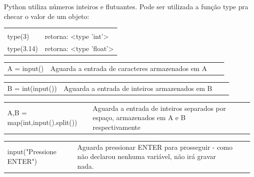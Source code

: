 \documentclass[landscape,a0paper,fontscale=0.285]{baposter} %
\begin{document}
\begin{poster}
{						
						\colorbox[HTML]{CCFFFF}{} \linebreak \linebreak
						Python utiliza números inteiros e flutuantes. Pode ser utilizada a função type pra checar o valor de um objeto:\\
						\begin{tabular}{l l}
							\textbf{}\\
							type(3) & retorna: <type 'int'> \\
							type(3.14) & retorna: <type 'float'> \\
						\end{tabular}
						
						\dotfill \newline
						
						\colorbox[HTML]{CCFFFF}{}
						
						\begin{tabular}{lp{5.3cm}lp{3.0cm}|}
							A = input() & Aguarda a entrada de caracteres armazenados em A \\
						\end{tabular}
						\begin{tabular}{lp{4.7cm}lp{3.0cm}|}
							B = int(input()) & Aguarda a entrada de inteiros armazenados em B \\
						\end{tabular}
						\begin{tabular}{lp{2.6cm}lp{3.0cm}|}
							A,B = map(int,input().split()) & Aguarda a entrada de inteiros  separados por espaço, armazenados em A e B respectivamente \\
						\end{tabular}
						\begin{tabular}{lp{3.0cm}lp{3.0cm}|}
							input("Pressione ENTER") & Aguarda pressionar ENTER para prosseguir - como não declarou nenhuma variável, não irá gravar nada. \\
						\end{tabular}
						
						\vspace{0.0em} %
					}
					
					

\end{poster}
\end{document}
